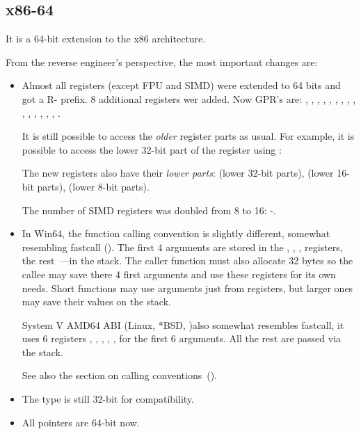 
\subsection{x86-64}
\label{x86-64}

It is a 64-bit extension to the x86 architecture.

From the reverse engineer's perspective, the most important changes are:

\myindex{\CLanguageElements!\Pointers}
\begin{itemize}

\item

Almost all registers (except FPU and SIMD) were extended to 64 bits and got a R- prefix.
8 additional registers wer added.
Now \ac{GPR}'s are: \RAX, \RBX, \RCX, \RDX, 
\RBP, \RSP, \RSI, \RDI, , , , 
, , , , . 

It is still possible to access the \emph{older} register parts as usual. 
For example, it is possible to access the lower 32-bit part of the \RAX register using \EAX:


The new  registers also have their \emph{lower parts}:  (lower 32-bit parts),
 (lower 16-bit parts),  (lower 8-bit parts).


The number of SIMD registers was doubled from 8 to 16: -.

\item

In Win64, the function calling convention is slightly different, somewhat resembling fastcall
().
The first 4 arguments are stored in the \RCX, \RDX, ,  registers, the rest~---in the stack.
The \gls{caller} function must also allocate 32 bytes so the \gls{callee} may save there 4 first arguments and use these 
registers for its own needs.
Short functions may use arguments just from registers, but larger ones may save their values on the stack.

System V AMD64 ABI (Linux, *BSD, \MacOSX)\SysVABI also somewhat resembles
fastcall, it uses 6 registers 
\RDI, \RSI, \RDX, \RCX, ,  for the first 6 arguments.
All the rest are passed via the stack.

See also the section on calling conventions~().

\item
The \CCpp \Tint type is still 32-bit for compatibility.

\item
All pointers are 64-bit now.

\end{itemize}


